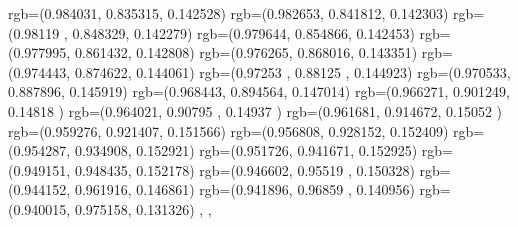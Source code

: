 {{{		  rgb=(0.984031,  0.835315,  0.142528)
		  rgb=(0.982653,  0.841812,  0.142303)
		  rgb=(0.98119 ,  0.848329,  0.142279)
		  rgb=(0.979644,  0.854866,  0.142453)
		  rgb=(0.977995,  0.861432,  0.142808)
		  rgb=(0.976265,  0.868016,  0.143351)
		  rgb=(0.974443,  0.874622,  0.144061)
		  rgb=(0.97253 ,  0.88125 ,  0.144923)
		  rgb=(0.970533,  0.887896,  0.145919)
		  rgb=(0.968443,  0.894564,  0.147014)
		  rgb=(0.966271,  0.901249,  0.14818 )
		  rgb=(0.964021,  0.90795 ,  0.14937 )
		  rgb=(0.961681,  0.914672,  0.15052 )
		  rgb=(0.959276,  0.921407,  0.151566)
		  rgb=(0.956808,  0.928152,  0.152409)
		  rgb=(0.954287,  0.934908,  0.152921)
		  rgb=(0.951726,  0.941671,  0.152925)
		  rgb=(0.949151,  0.948435,  0.152178)
		  rgb=(0.946602,  0.95519 ,  0.150328)
		  rgb=(0.944152,  0.961916,  0.146861)
		  rgb=(0.941896,  0.96859 ,  0.140956)
		  rgb=(0.940015,  0.975158,  0.131326)
		},
	},
}

\endinput
